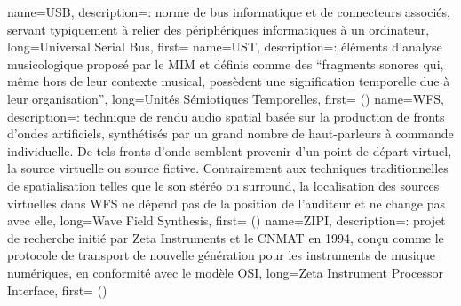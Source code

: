 {
    name={USB},
    description={\textit{}: norme de bus informatique et de connecteurs associés, servant typiquement à relier des périphériques informatiques à un ordinateur},
    long={Universal Serial Bus},
    first={}
}
{
    name={UST},
    description={\textit{}: éléments d'analyse musicologique proposé par le \gls{MIM} et définis comme des ``fragments sonores qui, même hors de leur contexte musical, possèdent une signification temporelle due à leur organisation''},
    long={Unités Sémiotiques Temporelles},
    first={ ()}
}
{
    name={WFS},
    description={\textit{}: technique de rendu audio spatial basée sur la production de fronts d'ondes artificiels, synthétisés par un grand nombre de haut-parleurs à commande individuelle. De tels fronts d'onde semblent provenir d'un point de départ virtuel, la source virtuelle ou source fictive. Contrairement aux techniques traditionnelles de spatialisation telles que le son stéréo ou surround, la localisation des sources virtuelles dans WFS ne dépend pas de la position de l'auditeur et ne change pas avec elle},
    long={Wave Field Synthesis},
    first={ ()}
}
{
    name={ZIPI},
    description={\textit{}: projet de recherche initié par Zeta Instruments et le \gls{CNMAT} en 1994, conçu comme le protocole de transport de nouvelle génération pour les instruments de musique numériques, en conformité avec le modèle \gls{OSI}},
    long={Zeta Instrument Processor Interface},
    first={ ()}
}


%
